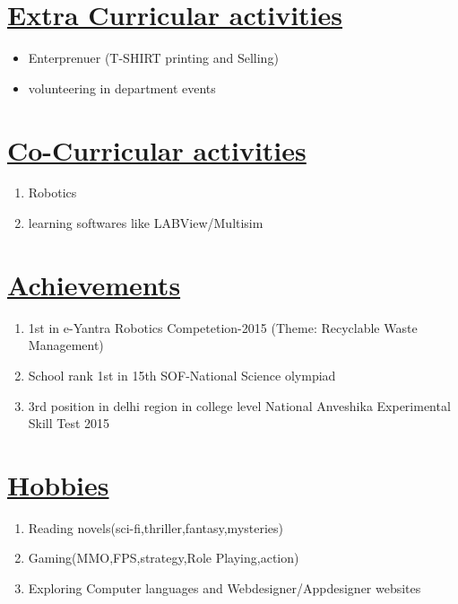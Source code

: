 \documentclass[14pt,a4paper,twoside]{article}
\begin{document}
	\section*{\underline{\textbf{Extra Curricular activities}}}
		\begin{itemize}
			\item Enterprenuer (T-SHIRT printing and Selling)
			\item volunteering in department events		
		\end{itemize}
		
	\section*{\underline{\textbf{Co-Curricular activities}}}
		\begin{enumerate}
			\item Robotics
			\item learning softwares like LABView/Multisim
		\end{enumerate}
		
	\section*{\underline{\textbf{Achievements}}}
		\begin{enumerate}
			\item 1st in e-Yantra Robotics Competetion-2015 (Theme: Recyclable Waste Management)
			\item School rank 1st in 15th SOF-National Science olympiad  
			\item 3rd position in delhi region in college level National Anveshika Experimental Skill Test 2015
		\end{enumerate}	
		
	\section*{\underline{\textbf{Hobbies}}}
		\begin{enumerate}
			\item Reading novels(sci-fi,thriller,fantasy,mysteries)
			\item Gaming(MMO,FPS,strategy,Role Playing,action)
			\item Exploring Computer languages and Webdesigner/Appdesigner websites
		\end{enumerate}
	
		
\end{document}
